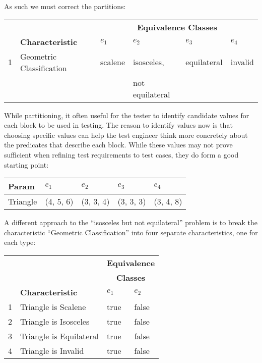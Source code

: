 As such we must correct the partitions:

\begin{center}
\begin{tabular}{rlllll}
    \toprule
    & & \multicolumn{4}{c}{\bf Equivalence Classes} \\
    \cline{3-6}
    & {\bf Characteristic} & $e_1$ & $e_2$ & $e_3$ & $e_4$ \\
    \midrule
    1 & Geometric Classification & scalene & isosceles, & equilateral & invalid \\
    & & & not equilateral & & \\
    \bottomrule    
\end{tabular}
\end{center}

While partitioning, it often useful for the tester to identify candidate values
for each block to be used in testing. The reason to identify values now is that
choosing specific values can help the test engineer think more concretely about
the predicates that describe each block. While these values may not prove
sufficient when refining test requirements to test cases, they do form a good
starting point:

\begin{center}
    \begin{tabular}{lllll}
        \toprule
        {\bf Param} & $e_1$ & $e_2$ & $e_3$ & $e_4$ \\
        \midrule
        Triangle & (4, 5, 6) & (3, 3, 4) & (3, 3, 3) & (3, 4, 8) \\
        \bottomrule    
    \end{tabular}
    \end{center}

A different approach to the ``isosceles but not equilateral'' problem is to
break the characteristic ``Geometric Classification'' into four separate
characteristics, one for each type:

\begin{center}
\begin{tabular}{rlll}
    \toprule
    & & \multicolumn{2}{c}{\bf Equivalence} \\
    & & \multicolumn{2}{c}{\bf Classes} \\
    \cline{3-4}
    & {\bf Characteristic} & $e_1$ & $e_2$ \\
    \midrule
    1 & Triangle is Scalene & true & false \\
    2 & Triangle is Isosceles & true & false \\
    3 & Triangle is Equilateral & true & false \\
    4 & Triangle is Invalid & true & false \\
    \bottomrule    
\end{tabular}
\end{center}

